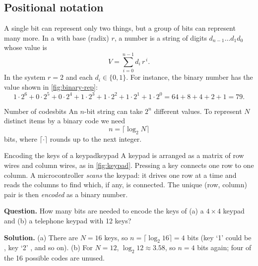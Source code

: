 
\subsection{Positional notation}
A single bit can represent only two things, but a group of bits can represent many more. In a  with base (radix) $r$, a number is a string of digits $d_{n-1}\dots d_1 d_0$ whose value is
\begin{equation}
  V = \sum_{i=0}^{n-1} d_i\, r^{\,i}.
  \label{eq:positional}
\end{equation}
In the  system $r=2$ and each $d_i\in\{0,1\}$. For instance, the binary number  has the value shown in \cref{fig:binary-rep}:
\[
  1\cdot 2^6 + 0\cdot 2^5 + 0\cdot 2^4 + 1\cdot 2^3 + 1\cdot 2^2 + 1\cdot 2^1 + 1\cdot 2^0
  = 64 + 8 + 4 + 2 + 1 = 79.
\]


\begin{definition}{Number of codes}{bits}
An $n$-bit string can take $2^n$ different values. To represent $N$ distinct items by a binary code we need
\[
  n = \lceil \log_2 N \rceil
\]
bits, where $\lceil\cdot\rceil$ rounds up to the next integer.
\end{definition}

\begin{example}{Encoding the keys of a keypad}{keypad}
A keypad is arranged as a matrix of row wires and column wires, as in \cref{fig:keypad}. Pressing a key connects one row to one column. A
microcontroller \emph{scans} the keypad: it drives one row at a time and reads the columns to find which, if any, is connected. The
unique (row, column) pair is then \emph{encoded} as a binary number.

\textbf{Question.} How many bits are needed to encode the keys of (a) a $4\times4$ keypad and (b) a telephone keypad with 12 keys?

\textbf{Solution.} (a) There are $N=16$ keys, so $n=\lceil\log_2 16\rceil = 4$ bits (key `1' could be , key `2' , and so on). (b) For $N=12$, $\log_2 12 \approx 3.58$, so $n=4$ bits again; four of the 16 possible codes are unused.
\end{example}

